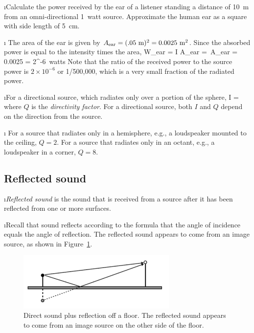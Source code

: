 \i \exer Calculate the power received by the ear of
a listener standing a distance of 10~m from an
omni-directional 1~watt source.
Approximate the human ear as a square with side length
of 5~cm.

\i \ans
The area of the ear is given by 
$A_{\rm ear} = (.05~{\rm m})^2 = 0.0025~{\rm m}^2$.
Since the absorbed power is equal to the intensity times
the area,
%
\be
W_{\rm ear} = I A_{\rm ear} 
=\, A_{\rm ear}
= 0.0025
= 2^{-6}~{\rm watts}
\ee
%
Note that the ratio of the received power to the source
power is $2\times 10^{-6}$ or 1/500,000, which is a
very small fraction of the radiated power.

\i For a directional source, which radiates only over a 
portion of the sphere,
%
\be
I = 
\ee
%
where $Q$ is the {\em directivity factor}.
For a directional source, both $I$ and $Q$ depend on 
the direction from the source.
 
\i \ex
For a source that radiates only in a hemisphere, e.g.,
a loudspeaker mounted to the ceiling, $Q=2$.
For a source that radiates only in an octant, e.g., 
a loudspeaker in a corner, $Q=8$.

\ei
\subsection{Reflected sound}
\bi

\i {\em Reflected sound} is the sound that is received 
from a source after it has been reflected from one or more surfaces.

\i Recall that sound reflects according to the formula that
the angle of incidence equals the angle of reflection.
The reflected sound appears to come from an image source, as shown
in Figure~\ref{f:reflection_floor}.
%
\begin{figure}[htbp]
\begin{center}
\includegraphics[width=0.7\textwidth]{reflection_floor}
\caption{Direct sound plus reflection off a floor.
The reflected sound appears to come from an image
source on the other side of the floor.}
\label{f:reflection_floor}
\end{center}
\end{figure}
%

